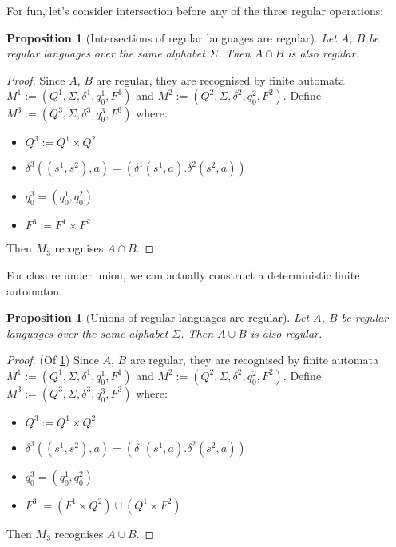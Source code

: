\documentclass{article}
\theoremstyle{break}
\newtheorem{proposition}[theorem]{Proposition}
\begin{document}
For fun, let's consider intersection before any of the three regular operations:
\begin{proposition}[Intersections of regular languages are regular]
  \label{prop:intersection-of-regular-languages-regular}
    Let $A$, $B$ be regular languages over the same alphabet $\Sigma$. 
    Then $A\cap B$ is also regular.
  \end{proposition}
  
  \begin{proof}
  \label{prf:intersection-of-regular-languages-regular}
    Since $A$, $B$ are regular, they are recognised by finite automata $M^1:=(Q^1,\Sigma,\delta^1,q^1_0,F^1)$ and $M^2:=(Q^2,\Sigma,\delta^2,q^2_0,F^2)$.
    Define $M^3:=(Q^3,\Sigma,\delta^3,q^3_0,F^3)$ where:
    \begin{itemize}
      \item $Q^3 := Q^1 \times Q^2$
      \item $\delta^3((s^1, s^2), a) = (\delta^1(s^1,a). \delta^2(s^2, a))$
      \item $q^3_0 = (q^1_0, q^2_0)$
      \item $F^3 := F^1\times F^2$
    \end{itemize}
    Then $M_3$ recognises $A\cap B$.
  \end{proof}

For closure under union, we can actually construct a deterministic finite automaton.

\begin{proposition}[Unions of regular languages are regular]
\label{prop:union-of-regular-languages-regular}
Let $A$, $B$ be regular languages over the same alphabet $\Sigma$. 
Then $A\cup B$ is also regular.
\end{proposition}

\begin{proof}(Of \ref{prop:union-of-regular-languages-regular})
\label{prf:union-of-regular-languages-regular}
Since $A$, $B$ are regular, they are recognised by finite automata $M^1:=(Q^1,\Sigma,\delta^1,q^1_0,F^1)$ and $M^2:=(Q^2,\Sigma,\delta^2,q^2_0,F^2)$.
Define $M^3:=(Q^3,\Sigma,\delta^3,q^3_0,F^3)$ where:
\begin{itemize}
  \item $Q^3 := Q^1 \times Q^2$
  \item $\delta^3((s^1, s^2), a) = (\delta^1(s^1,a). \delta^2(s^2, a))$
  \item $q^3_0 = (q^1_0, q^2_0)$
  \item $F^3 := \left(F^1\times Q^2\right) \cup \left(Q^1\times F^2\right)$
\end{itemize}
Then $M_3$ recognises $A\cup B$.
\end{proof}
\end{document}
